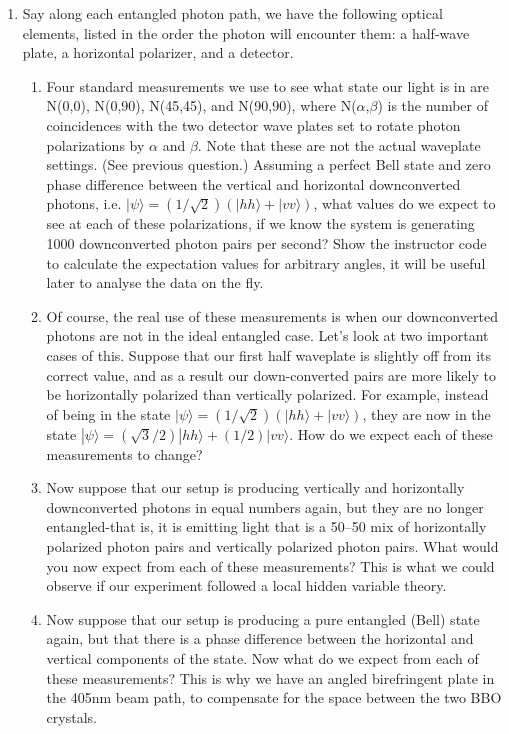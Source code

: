 \documentclass{../signatures}
\begin{document}
\begin{enumerate}
    \item Say along each entangled photon path, we have the following optical elements, listed in the order the photon will encounter them: a half-wave plate, a horizontal polarizer, and a detector.
    \begin{enumerate}
      \item{Four standard measurements we use to see what state our light is in are N(0,0), N(0,90), N(45,45), and N(90,90), where N($\alpha$,$\beta$) is the number of coincidences with the two detector wave plates set to rotate photon polarizations by $\alpha$ and $\beta$. Note that these are not the actual waveplate settings. (See previous question.) Assuming a perfect Bell state and zero phase difference between the vertical and horizontal downconverted photons, i.e. $|\psi\rangle=(1/\sqrt{2})(|hh\rangle + |vv\rangle)$, what values do we expect to see at each of these polarizations, if we know the system is generating 1000 downconverted photon pairs per second? Show the instructor code to calculate the expectation values for arbitrary angles, it will be useful later to analyse the data on the fly.}
      \item{Of course, the real use of these measurements is when our downconverted photons are not in the ideal entangled case. Let's look at two important cases of this. Suppose that our first half waveplate is slightly off from its correct value, and as a result our down-converted pairs are more likely to be horizontally polarized than vertically polarized. For example, instead of being in the state $|\psi\rangle=(1/\sqrt{2})(|hh\rangle + |vv\rangle)$, they are now in the state $|\psi\rangle= (\sqrt{3}/2) |hh\rangle + (1/2) |vv\rangle$. How do we expect each of these measurements to change?}
      \item{Now suppose that our setup is producing vertically and horizontally downconverted photons in equal numbers again, but they are no longer entangled-that is, it is emitting light that is a 50–50 mix of horizontally polarized photon pairs and vertically polarized photon pairs. What would you now expect from each of these measurements? This is what we could observe if our experiment followed a local hidden variable theory.}
      \item{Now suppose that our setup is producing a pure entangled (Bell) state again, but that there is a phase difference between the horizontal and vertical components of the state. Now what do we expect from each of these measurements? This is why we have an angled birefringent plate in the 405nm beam path, to compensate for the space between the two BBO crystals.}
    \end{enumerate}


\end{enumerate}
\end{document}
